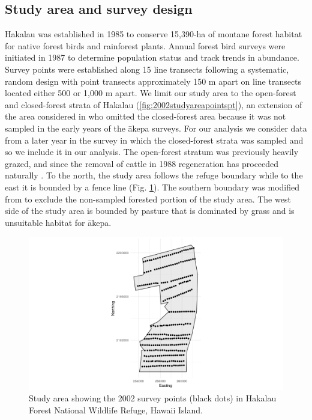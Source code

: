 \documentclass[preprint,12pt]{elsarticle}
\newcommand{\akepa}{\textquotesingle\={a}kepa}  %
\newcommand{\hawaii}{Hawai\textquotesingle i}   %
\begin{document}
\subsection{Study area and survey design}

Hakalau was established in 1985 to conserve 15,390-ha of montane forest habitat for native forest birds and rainforest plants. Annual forest bird surveys were initiated in 1987 to determine population status and track trends in abundance. Survey points were established along 15 line transects following a systematic, random design with point transects approximately 150 m apart on line transects located either 500 or 1,000 m apart. We limit our study area to the open-forest and closed-forest strata of Hakalau (\autoref{fig:2002studyareapointspt}), an extension of the area considered in \cite{camp_population_2010, camp_statespace_2016} who omitted the closed-forest area because it was not sampled in the early years of the \akepa{} surveys.  For our analysis we consider data from a later year in the survey in which the closed-forest strata was sampled and so we include it in our analysis.  The open-forest stratum was previously heavily grazed, and since the removal of cattle in 1988 regeneration has proceeded naturally \citep{maxfield_hakalau_1998}. To the north, the study area follows the refuge boundary while to the east it is bounded by a fence line (Fig. \ref{fig:2002studyareapointspt}). The southern boundary was modified from \cite{camp_population_2010} to exclude the non-sampled forested portion of the study area. The west side of the study area is bounded by pasture that is dominated by grass and is unsuitable habitat for \akepa.

\begin{figure}
	\centering
	\includegraphics[scale=0.5]{figures/study_area_design.png}
	\caption{Study area showing the 2002 survey points (black dots) in Hakalau Forest National Wildlife Refuge, \hawaii{} Island.}
	\label{fig:2002studyareapointspt}
\end{figure}
\end{document}
